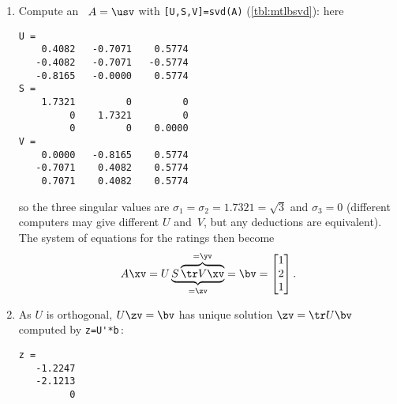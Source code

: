 \begin{example}
\begin{solution}

\begin{enumerate}
\item Compute an \svd\ \(A=\usv\) with \verb|[U,S,V]=svd(A)| (\cref{tbl:mtlbsvd}): here
\begin{verbatim}
U =
    0.4082   -0.7071    0.5774
   -0.4082   -0.7071   -0.5774
   -0.8165   -0.0000    0.5774
S =
    1.7321         0         0
         0    1.7321         0
         0         0    0.0000
V =
    0.0000   -0.8165    0.5774
   -0.7071    0.4082    0.5774
    0.7071    0.4082    0.5774
\end{verbatim}
so the three singular values are \(\sigma_1=\sigma_2=1.7321=\sqrt3\) and \(\sigma_3=0\)
(different computers may give different \(U\) and~\(V\), but any deductions are equivalent).
The system of equations for the ratings then become
\begin{equation*}
A\xv=
U\underbrace{S\overbrace{\tr V\xv}^{=\yv}}_{=\zv}
=\bv=\begin{bmatrix} 1\\ 2\\ 1 \end{bmatrix}.
\end{equation*}

\item As \(U\) is orthogonal, \(U\zv=\bv\) has unique solution \(\zv=\tr U\bv\) computed by \verb|z=U'*b|\,:
\begin{verbatim}
z =
   -1.2247
   -2.1213
         0
\end{verbatim}



\end{enumerate}
\end{solution}
\end{example}
